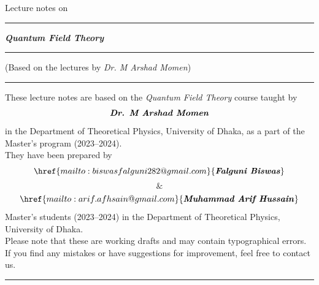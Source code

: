 \documentclass[14pt]{article} %
\begin{document}
\begin{titlepage}
    \centering
    \vspace*{3cm}
    {Lecture notes on \par}
    \vspace{1cm}
    \hrule
    \vspace{1cm}
    {\huge \textit{\textbf{Quantum Field Theory}} \par}
    \vspace{1cm}
    \hrule
    \vspace{1cm}
    \small
   (Based on the lectures by \textit{Dr. M Arshad Momen})
\vspace{3cm}
\end{titlepage}

\newpage
\thispagestyle{empty} %

\vspace*{6cm} %
\hrule
\vspace*{1.5cm}
\begin{center}
    \begin{minipage}{0.85\textwidth}
        \centering
        
        These lecture notes are based on the \textit{Quantum Field Theory} course taught by $${\textbf{\textit{Dr. M Arshad Momen}}}$$ in the Department of Theoretical Physics, University of Dhaka, as a part of the Master's program (2023–2024). \\
        \vspace{0.6cm}
        They have been prepared by $$\href{mailto:biswasfalguni282@gmail.com}{\textbf{\textit{Falguni Biswas}}}$$ $$\textbf{\&}$$ $$\href{mailto:arif.afhsain@gmail.com}{\textbf{\textit{Muhammad Arif Hussain}}}$$ Master's students (2023–2024) in the Department of Theoretical Physics, University of Dhaka.\\
        \vspace{0.6cm}
        Please note that these are working drafts and may contain typographical errors. If you find any mistakes or have suggestions for improvement, feel free to contact us.
    \end{minipage}
\end{center}
\vspace*{1.5cm}
\hrule
\vspace*{\fill} %
\newpage
\tableofcontents
\newpage
\end{document}

